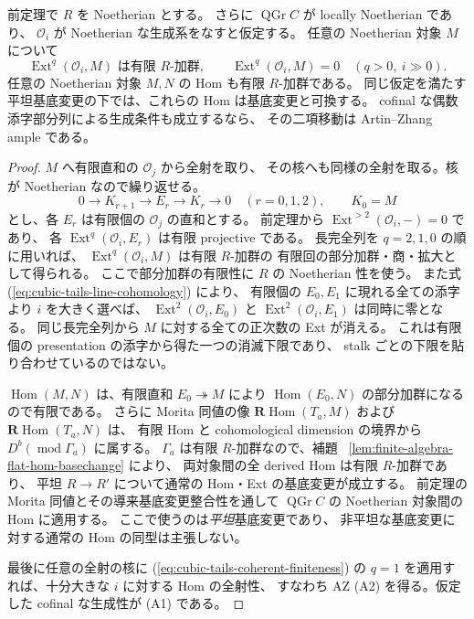 \begin{lemma}
\label{lem:relative-cubic-coherent-cohomology}
前定理で $R$ を Noetherian とする。
さらに $\operatorname{QGr}C$ が locally Noetherian であり、
$\mathcal O_i$ が Noetherian な生成系をなすと仮定する。
任意の Noetherian 対象 $M$ について
\[
 \operatorname{Ext}^q(\mathcal O_i,M)
 \text{ は有限 }R\text{-加群},\qquad
 \operatorname{Ext}^{q}(\mathcal O_i,M)=0
 \quad(q>0,\ i\gg0).
 \tag{CT-finite}\label{eq:cubic-tails-coherent-finiteness}
\]
任意の Noetherian 対象 $M,N$ の Hom も有限 $R$-加群である。
同じ仮定を満たす平坦基底変更の下では、これらの Hom は基底変更と可換する。
cofinal な偶数添字部分列による生成条件も成立するなら、
その二項移動は Artin--Zhang ample である。
\end{lemma}
\begin{proof}
$M$ へ有限直和の $\mathcal O_j$ から全射を取り、
その核へも同様の全射を取る。核が Noetherian なので繰り返せる。
\[
 0\to K_{r+1}\to E_r\to K_r\to0
 \quad(r=0,1,2),\qquad K_0=M
\]
とし、各 $E_r$ は有限個の $\mathcal O_j$ の直和とする。
前定理から $\operatorname{Ext}^{>2}(\mathcal O_i,-)=0$ であり、
各 $\operatorname{Ext}^q(\mathcal O_i,E_r)$ は有限 projective である。
長完全列を $q=2,1,0$ の順に用いれば、
$\operatorname{Ext}^q(\mathcal O_i,M)$ は有限 $R$-加群の
有限回の部分加群・商・拡大として得られる。
ここで部分加群の有限性に $R$ の Noetherian 性を使う。
また式 (\ref{eq:cubic-tails-line-cohomology}) により、
有限個の $E_0,E_1$ に現れる全ての添字より $i$ を大きく選べば、
$\operatorname{Ext}^2(\mathcal O_i,E_0)$ と
$\operatorname{Ext}^2(\mathcal O_i,E_1)$ は同時に零となる。
同じ長完全列から $M$ に対する全ての正次数の Ext が消える。
これは有限個の presentation の添字から得た一つの消滅下限であり、
stalk ごとの下限を貼り合わせているのではない。

$\operatorname{Hom}(M,N)$ は、有限直和 $E_0\twoheadrightarrow M$
により $\operatorname{Hom}(E_0,N)$ の部分加群になるので有限である。
さらに Morita 同値の像
$\mathbf R\operatorname{Hom}(T_a,M)$ および
$\mathbf R\operatorname{Hom}(T_a,N)$ は、
有限 Hom と cohomological dimension の境界から
$D^b(\operatorname{mod}\Gamma_a)$ に属する。
$\Gamma_a$ は有限 $R$-加群なので、補題~
\ref{lem:finite-algebra-flat-hom-basechange} により、
両対象間の全 derived Hom は有限 $R$-加群であり、
平坦 $R\to R'$ について通常の Hom・Ext の基底変更が成立する。
前定理の Morita 同値とその導来基底変更整合性を通して
$\operatorname{QGr}C$ の Noetherian 対象間の Hom に適用する。
ここで使うのは\emph{平坦}基底変更であり、
非平坦な基底変更に対する通常の Hom の同型は主張しない。

最後に任意の全射の核に (\ref{eq:cubic-tails-coherent-finiteness}) の
$q=1$ を適用すれば、十分大きな $i$ に対する Hom の全射性、
すなわち AZ (A2) を得る。仮定した cofinal な生成性が (A1) である。
\end{proof}

